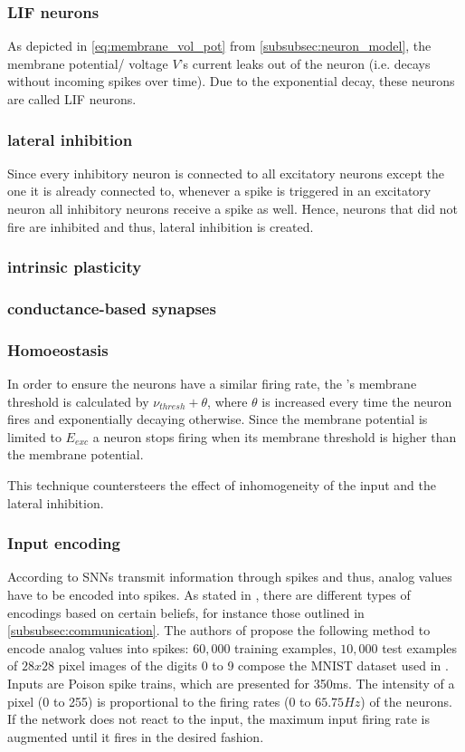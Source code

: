 \subsubsection{\ac{LIF} neurons}
As depicted in \autoref{eq:membrane_vol_pot} from \autoref{subsubsec:neuron_model}, the membrane potential/ voltage $V$'s current leaks out of the neuron (i.e. decays without incoming spikes over time).
Due to the exponential decay, these neurons are called \ac{LIF} neurons.


\subsubsection{lateral inhibition}
Since every inhibitory neuron is connected to all excitatory neurons except the one it is already connected to, whenever a spike is triggered in an excitatory neuron all inhibitory neurons receive a spike as well.
Hence, neurons that did not fire are inhibited and thus, lateral inhibition is created.


\subsubsection{intrinsic plasticity}


\subsubsection{conductance-based synapses}


\subsubsection{Homoeostasis}
In order to ensure the neurons have a similar firing rate, the \eN{}'s membrane threshold is calculated by $\nu_{thresh} + \theta$, where $\theta$ is increased every time the neuron fires and exponentially decaying otherwise.
Since the membrane potential is limited to $E_{exc}$ a neuron stops firing when its membrane threshold is higher than the membrane potential.

This technique countersteers the effect of inhomogeneity of the input and the lateral inhibition.


\subsubsection{Input encoding}
According to \cite{DIET_SNN} \acp{SNN} transmit information through spikes and thus, analog values have to be encoded into spikes.
As stated in \cite{DIET_SNN}, there are different types of encodings based on certain beliefs, 
for instance those outlined in \autoref{subsubsec:communication}.
The authors of \cite{SNN} propose the following method to encode analog values into spikes:
$60,000$ training examples, $10,000$ test examples of $28x28$ pixel images of the digits 0 to 9 compose the MNIST dataset used in \cite{SNN}.
Inputs are Poison spike trains, which are presented for 350ms.
The intensity of a pixel (0 to 255) is proportional to the firing rates (0 to $65.75 Hz$) of the neurons.
If the network does not react to the input, the maximum input firing rate is augmented until it fires in the desired fashion. 


